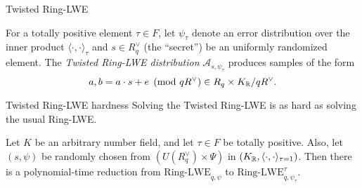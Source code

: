 \documentclass[notheorems, bigger]{beamer}
\begin{document}
\begin{frame}[label={sec:org1097246}]{Twisted Ring-LWE}
\begin{text}
  For a totally positive element $\tau \in F$, let $\psi_\tau$ denote an error distribution
  over the inner product $\langle{\cdot,\cdot}\rangle_\tau$ and $s \in R^\vee_q$ (the “secret”) be an
  uniformly randomized element. The \emph{Twisted Ring-LWE distribution}
  $\mathcal{A}_{s,\psi_\tau}$ produces samples of the form
  \[
    a, b = a \cdot s + e \pmod{qR^\vee} \in R_q \times K_{\mathbb{R}}/qR^\vee.
\]
\end{text}
\end{frame}
\begin{frame}[label={sec:org8b744ea}]{Twisted Ring-LWE hardness}
Solving the Twisted Ring-LWE is as hard as solving the usual Ring-LWE.
\begin{theorem}
  Let $K$ be an arbitrary number field, and let $\tau \in F$ be totally positive.
  Also, let $(s,\psi)$ be randomly chosen from $(U(R_q^\vee)\times \Psi)$ in $(K_{\mathbb{R}},\langle{\cdot,\cdot}\rangle_{\tau=1})$.
  Then there is a polynomial-time reduction from $\mbox{Ring-LWE}_{q,\psi}$ to $\mbox{Ring-LWE}^\tau_{q,\psi_\tau}$.
\end{theorem}
\end{frame}
\end{document}
